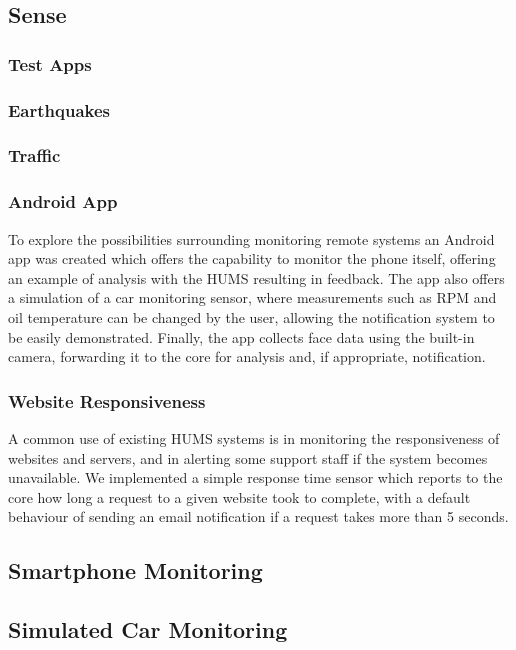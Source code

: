 \documentclass[10pt,a4paper]{article}
\begin{document}
\subsection{Sense}
\label{sec:sense}

\subsubsection{Test Apps}

\subsubsection{Earthquakes}

\subsubsection{Traffic}

\subsubsection{Android App}
To explore the possibilities surrounding monitoring remote systems an Android app was created which offers the capability to monitor the phone itself, offering an example of analysis with the HUMS resulting in feedback. The app also offers a simulation of a car monitoring sensor, where measurements such as RPM and oil temperature can be changed by the user, allowing the notification system to be easily demonstrated. Finally, the app collects face data using the built-in camera, forwarding it to the core for analysis and, if appropriate, notification.

\subsubsection{Website Responsiveness}
A common use of existing HUMS systems is in monitoring the responsiveness of websites and servers, and in alerting some support staff if the system becomes unavailable. We implemented a simple response time sensor which reports to the core how long a request to a given website took to complete, with a default behaviour of sending an email notification if a request takes more than 5 seconds.

\subsection{Smartphone Monitoring}

\subsection{Simulated Car Monitoring}
\end{document}
